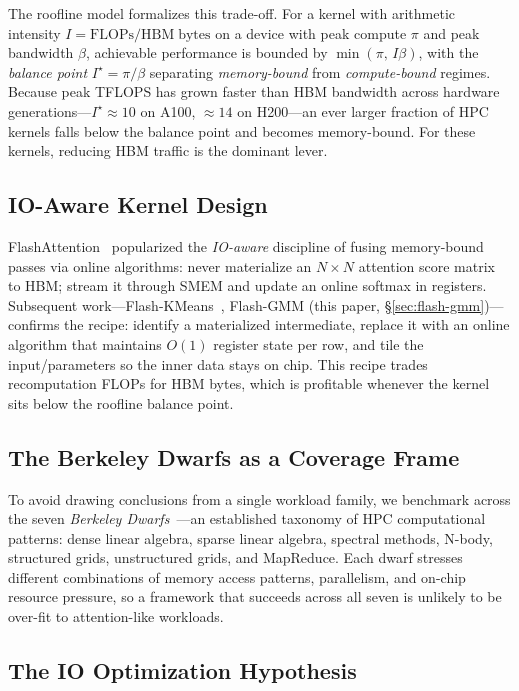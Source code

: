 \documentclass[sigconf,nonacm]{acmart}
\begin{document}
The roofline model formalizes this trade-off. For a kernel with
arithmetic intensity $I = \mathrm{FLOPs}/\mathrm{HBM\;bytes}$ on a
device with peak compute $\pi$ and peak bandwidth $\beta$, achievable
performance is bounded by $\min(\pi,\,I\beta)$, with the
\emph{balance point} $I^\star = \pi/\beta$ separating
\emph{memory-bound} from \emph{compute-bound} regimes. Because peak
TFLOPS has grown faster than HBM bandwidth across hardware
generations---$I^\star \approx 10$ on A100, $\approx 14$ on H200---an
ever larger fraction of HPC kernels falls below the balance point and
becomes memory-bound. For these kernels, reducing HBM traffic is the
dominant lever.

\subsection{IO-Aware Kernel Design}

FlashAttention~\cite{dao2022flashattention} popularized the
\emph{IO-aware} discipline of fusing memory-bound passes via online
algorithms: never materialize an $N{\times}N$ attention score matrix
to HBM; stream it through SMEM and update an online softmax in
registers. Subsequent work---Flash-KMeans~\cite{flashkmeans2026},
Flash-GMM (this paper, \S\ref{sec:flash-gmm})---confirms the recipe:
identify a materialized intermediate, replace it with an online
algorithm that maintains $O(1)$ register state per row, and tile the
input/parameters so the inner data stays on chip. This recipe trades
recomputation FLOPs for HBM bytes, which is profitable whenever the
kernel sits below the roofline balance point.

\subsection{The Berkeley Dwarfs as a Coverage Frame}
\label{sec:bg-dwarfs}

To avoid drawing conclusions from a single workload family, we
benchmark across the seven \emph{Berkeley Dwarfs}~\cite{asanovic2009dwarfs}---an
established taxonomy of HPC computational patterns: dense linear
algebra, sparse linear algebra, spectral methods, N-body, structured
grids, unstructured grids, and MapReduce. Each dwarf stresses
different combinations of memory access patterns, parallelism, and
on-chip resource pressure, so a framework that succeeds across all
seven is unlikely to be over-fit to attention-like workloads.

\subsection{The IO Optimization Hypothesis}
\end{document}
